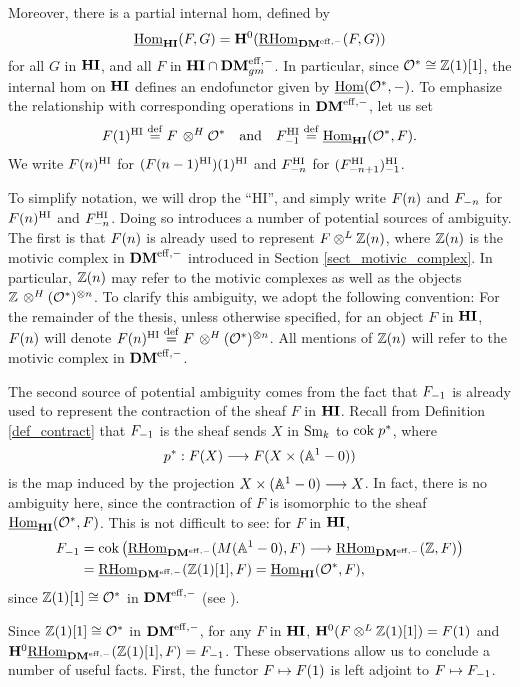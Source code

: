 Moreover, there is a partial internal hom, defined by
\[
\ihomHI(F, G) = \HH^0(\ihomDMf(F, G))
\]
for all $G$ in $\HI$, and all $F$ in $\HI \cap \DMeffgm$. In 
particular, since $\Ox \cong \Z(1)[1]$, the internal hom on $\HI$ 
defines an endofunctor given by $\ihom(\Ox, -)$. To emphasize the
relationship with corresponding operations in $\DMeff$, let us set
\[
\LHIs{F} \defeq F \tHI \Ox \hspace{10pt} \textrm{and}\hspace{10pt} 
   \RHIs{F} \defeq \ihomHI(\Ox, F).
\]
We write $\LHIs[n]{F}$ for $\LHIs{(\LHIs[n - 1]{F})}$ and 
$\RHIs[n]{F}$ for $\RHIs{(\RHIs[n + 1]{F})}$.

\begin{rmk}\label{rmk_contraction}
To simplify notation, we will drop the ``HI'', and simply write 
$\LHI[n]{F}$ and $\RHI[n]{F}$ for $\LHIs[n]{F}$ and $\RHIs[n]{F}$.
Doing so introduces a number of potential sources of ambiguity. 
The first is that $\LHI[n]{F}$ is already used to represent $F 
\tDM \Z(n)$, where $\Z(n)$ is the motivic complex in $\DMeff$ 
introduced in Section \ref{sect_motivic_complex}. In particular, 
$\LHI[n]{\Z}$ may refer to the motivic complexes as well as the 
objects $\Z \tHI (\Ox)^{\tensor n}$. To clarify this ambiguity, we 
adopt the following convention: For the remainder of the thesis, 
unless otherwise specified, for an object $F$ in $\HI$, 
$\LHI[n]{F}$ will denote $\LHIs[n]{F} \defeq F \tHI 
(\Ox)^{\tensor n}$. All mentions of $\Z(n)$ will refer to the 
motivic complex in $\DMeff$.

The second source of potential ambiguity comes from the fact that 
$\RHI{F}$ is already used to represent the contraction of the 
sheaf $F$ in $\HI$. Recall from Definition \ref{def_contract} that 
$\RHI{F}$ is the sheaf sends $X$ in $\Sm$ to $\cok p^*$, where 
\[
p^* : F(X) \to F(X \times (\A^1 - 0))
\]
is the map induced by the projection $X \times (\A^1 - 0) \to X$.
In fact, there is no ambiguity here, since the contraction of $F$ 
is isomorphic to the sheaf $\ihomHI(\Ox, F)$. This is not 
difficult to see: for $F$ in $\HI$,
\begin{align*}
\RHI{F} &= \mathrm{cok}\left(\ihomDMf(M(\A^1 - 0), F) \to \ihomDMf(\Z, F)\right) \\
&= \ihomDMf(\Z(1)[1], F) = \ihomHI(\Ox, F),
\end{align*}
since $\Z(1)[1] \cong \Ox$ in $\DMeff$ (see \cite[4.1]{MVW}).
\end{rmk}

Since $\Z(1)[1] \cong \O^*$ in $\DMeff$, for any $F$ in $\HI$, 
$\HH^0(F \tDM \Z(1)[1]) = \LHI{F}$ and $\HH^0\ihomDMf(\Z(1)[1], F) 
= \RHI{F}$. These observations allow us to conclude a number of useful
facts. First, the functor $F \mapsto \LHI{F}$ is left adjoint to 
$F \mapsto \RHI{F}$. 

